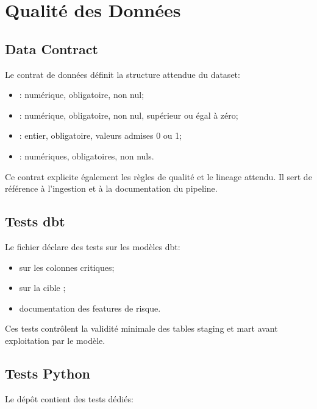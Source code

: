 \chapter{Qualité des Données}

\section{Data Contract}

Le contrat de données  définit la structure attendue du dataset:

\begin{itemize}
    \item {}: numérique, obligatoire, non nul;
    \item {}: numérique, obligatoire, non nul, supérieur ou égal à zéro;
    \item {}: entier, obligatoire, valeurs admises 0 ou 1;
    \item {}: numériques, obligatoires, non nuls.
\end{itemize}

Ce contrat explicite également les règles de qualité et le lineage attendu. Il sert de référence à l'ingestion et à la documentation du pipeline.

\section{Tests dbt}

Le fichier  déclare des tests sur les modèles dbt:

\begin{itemize}
    \item {} sur les colonnes critiques;
    \item {} sur la cible ;
    \item documentation des features de risque.
\end{itemize}

Ces tests contrôlent la validité minimale des tables staging et mart avant exploitation par le modèle.

\section{Tests Python}

Le dépôt contient des tests dédiés:

